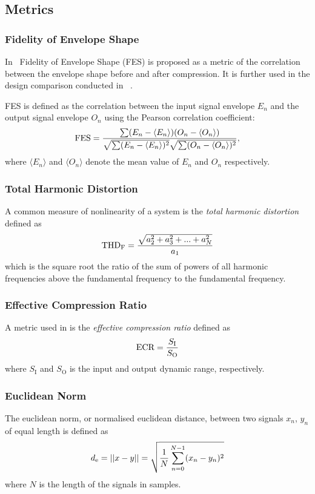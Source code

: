 \documentclass[../main2.tex]{subfiles}
\begin{document}
\subsection{Metrics}

\subsubsection{Fidelity of Envelope Shape} \label{fes}
In~\cite{stone2007quantifying} Fidelity of Envelope Shape (FES) is proposed as a metric of the correlation between the envelope shape before and after compression. It is further used in the design comparison conducted in ~\cite{reiss2012tutorial}.

FES is defined as the correlation between the input signal envelope $E_n$ and the output signal envelope $O_n$ using the Pearson correlation coefficient: \begin{equation}
\text{FES} = \dfrac{\sum(E_n - \langle E_n \rangle)(O_n - \langle O_n \rangle)}{\sqrt{\sum(E_n -\langle E_n \rangle )^2}\sqrt{\sum(O_n - \langle O_n \rangle )^2}},
\end{equation}
where $\langle E_n \rangle$ and $\langle O_n \rangle$ denote the mean value of $E_n$ and $O_n$ respectively.

\subsubsection{Total Harmonic Distortion}
A common measure of nonlinearity of a system is the \emph{total harmonic distortion} defined as \cite{dafx02}
\begin{align}
\text{THD}_\text{F} = \dfrac{\sqrt{a_2^2 + a_3^2 + ... + a_N^2}}{a_1}
\end{align}
which is the square root the ratio of the sum of powers of all harmonic frequencies above the fundamental frequency to the fundamental frequency.

\subsubsection{Effective Compression Ratio}
A metric used in \cite{stone1992syllabic} is the \emph{effective compression ratio} defined as
\begin{align}
\text{ECR} = \dfrac{S_\text{I}}{S_\text{O}}
\end{align}
where $S_\text{I}$ and $S_\text{O}$ is the input  and output dynamic range, respectively.

\subsubsection{Euclidean Norm}
The euclidean norm, or normalised euclidean distance, between two signals $x_n$, $y_n$ of equal length is defined as
\begin{align}
d_\text{e} = ||x-y|| = \sqrt{\frac{1}{N}\sum_{n=0}^{N-1}(x_n-y_n)^2}
\end{align}
where $N$ is the length of the signals in samples.
\end{document}
